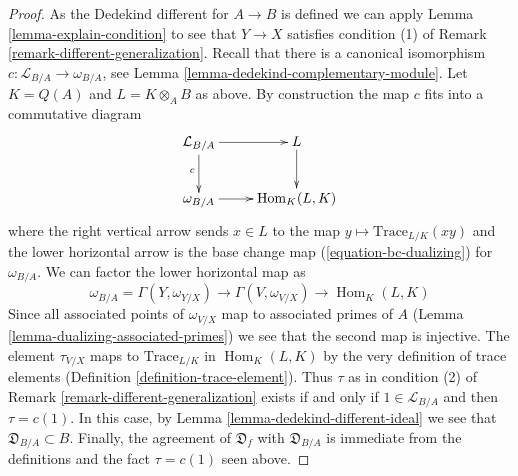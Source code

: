 \documentclass[10pt,a4paper]{amsart}
\theoremstyle{plain}
\theoremstyle{definition}
\theoremstyle{remark}
\numberwithin{equation}{subsection}
\def\Hom{\mathop{\mathrm{Hom}}\nolimits}
\begin{document}
\begin{proof}
As the Dedekind different for $A \to B$ is defined we can apply
Lemma \ref{lemma-explain-condition} to see that
$Y \to X$ satisfies condition (1) of
Remark \ref{remark-different-generalization}.
Recall that there is a canonical isomorphism
$c : \mathcal{L}_{B/A} \to \omega_{B/A}$, see
Lemma \ref{lemma-dedekind-complementary-module}.
Let $K = Q(A)$ and $L = K \otimes_A B$ as above.
By construction the map $c$ fits into a commutative diagram
$$
\xymatrix{
\mathcal{L}_{B/A} \ar[r] \ar[d]_c & L \ar[d] \\
\omega_{B/A} \ar[r] & \Hom_K(L, K)
}
$$
where the right vertical arrow sends $x \in L$ to the map
$y \mapsto \text{Trace}_{L/K}(xy)$ and the lower horizontal
arrow is the base change map (\ref{equation-bc-dualizing}) for $\omega_{B/A}$.
We can factor the lower horizontal map as
$$
\omega_{B/A} = \Gamma(Y, \omega_{Y/X})
\to \Gamma(V, \omega_{V/X}) \to \Hom_K(L, K)
$$
Since all associated points of $\omega_{V/X}$
map to associated primes of $A$
(Lemma \ref{lemma-dualizing-associated-primes})
we see that the second map is injective.
The element $\tau_{V/X}$ maps to $\text{Trace}_{L/K}$ in
$\Hom_K(L, K)$ by the very definition of trace elements
(Definition \ref{definition-trace-element}).
Thus $\tau$ as in condition (2) of
Remark \ref{remark-different-generalization}
exists if and only if $1 \in \mathcal{L}_{B/A}$ and then
$\tau = c(1)$. In this case, by Lemma \ref{lemma-dedekind-different-ideal}
we see that $\mathfrak{D}_{B/A} \subset B$.
Finally, the agreement of $\mathfrak{D}_f$ with $\mathfrak{D}_{B/A}$
is immediate from the definitions and the fact $\tau = c(1)$ seen above.
\end{proof}
\end{document}
